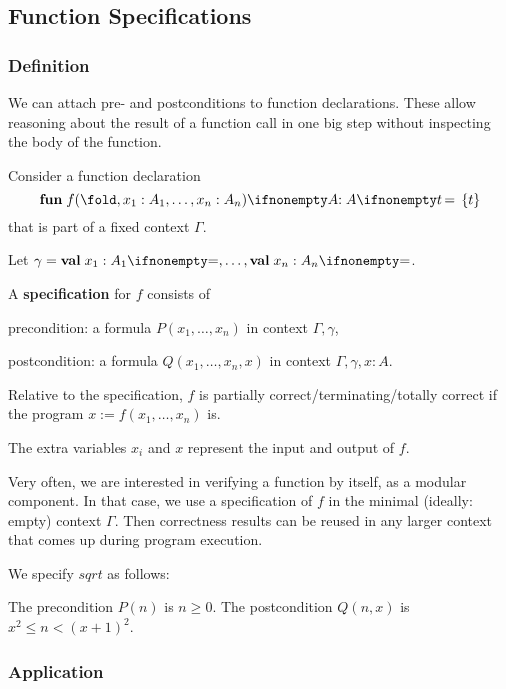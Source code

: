 \subsection{Function Specifications}

\subsubsection{Definition}

We can attach pre- and postconditions to function declarations.
These allow reasoning about the result of a function call in one big step without inspecting the body of the function.

\begin{definition}\label{def:fm:funspec}
Consider a function declaration
 \[\afunI[A]{f}{x_1:A_1,\ldots, x_n:A_n}{t}\]
that is part of a fixed context $\Gamma$.

Let $\gamma=\aval{x_1}{A_1}{},\ldots,\aval{x_n}{A_n}{}$.

A \textbf{specification} for $f$ consists of
\begin{compactitem}
 \item precondition: a formula $P(x_1,\ldots,x_n)$ in context $\Gamma,\gamma$,
 \item postcondition: a formula $Q(x_1,\ldots,x_n,x)$ in context $\Gamma,\gamma,x:A$.
\end{compactitem}

Relative to the specification, $f$ is partially correct/terminating/totally correct if the program $x:=f(x_1,\ldots,x_n)$ is.
\end{definition}

The extra variables $x_i$ and $x$ represent the input and output of $f$.

Very often, we are interested in verifying a function by itself, as a modular component.
In that case, we use a specification of $f$ in the minimal (ideally: empty) context $\Gamma$.
Then correctness results can be reused in any larger context that comes up during program execution.

\begin{example}\label{ex:sd:sqrt2}
We specify $sqrt$ as follows:

The precondition $P(n)$ is $n\geq 0$.
The postcondition $Q(n,x)$ is $x^2\leq n < (x+1)^2$.
\end{example}

\subsubsection{Application}

